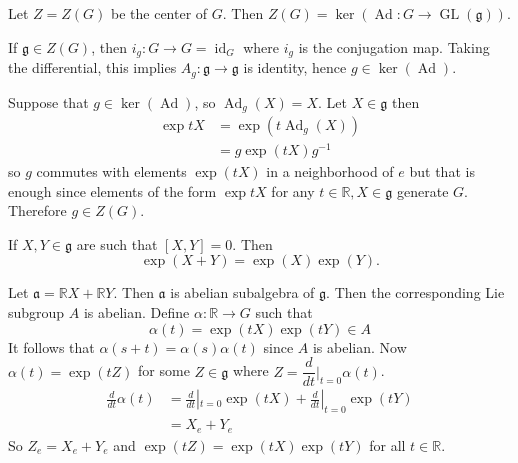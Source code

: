 \documentclass[11pt,a4paper]{scrarticle}
\theoremstyle{definition}
\renewenvironment{proof}[1][\proofname]{\vspace{-15pt}\begin{myproof}}{\end{myproof}}
\theoremstyle{greenbox}
\newcommand{\R}{\mathbb{R}}
\newcommand{\ag}{\mathfrak{a}}
\newcommand{\fg}{\mathfrak{g}}
\begin{document}
\begin{thm}
    Let $ Z = Z(G) $ be the center of $ G $. Then $ Z(G) = \ker ( \operatorname{Ad} : G \to \operatorname{GL}(\fg)) $.
\end{thm}
\begin{proof}
    If $ \fg \in Z(G) $, then $ i_{g}: G \to G = \operatorname{id}_{G} $ where $ i_{g} $ is the conjugation map. Taking the differential, this implies $ A_{g} : \fg  \to \fg$ is identity, hence $ g \in \ker( \operatorname{Ad}) $. 

    Suppose that $ g \in \ker( \operatorname{Ad}) $, %
    so $ \operatorname{Ad}_{g}(X) = X $. Let $ X \in \fg $ then \begin{align*}
        \exp tX & = \exp (t \operatorname{Ad}_{g}(X)) \\
        & = g \exp(tX) g^{-1}
    \end{align*}
    so $ g $ commutes with elements $ \exp(tX) $ in a neighborhood of $ e $ but that is enough since elements of the form $ \exp tX $ for any $ t \in \R, X \in \fg$ generate $ G $. Therefore $ g \in Z(G) $. 
\end{proof}

\begin{proposition}
    If $ X,Y \in \fg $ are such that $ [X,Y] = 0 $. Then 
    \[ \exp(X+Y) = \exp(X) \exp(Y) .\]
\end{proposition}
\begin{proof}
    Let $ \ag = \R X+ \R Y $. Then $ \ag $ is abelian subalgebra of $ \fg $. Then the corresponding Lie subgroup $ A $ is abelian. Define $ \alpha : \R \to G $ such that 
    \[ \alpha(t) = \exp(tX) \exp(tY) \in A\]
    It follows that $ \alpha(s+t) = \alpha(s) \alpha(t) $ since $ A $ is abelian. Now $ \alpha (t) = \exp(tZ) $ for some $ Z \in \fg $ where $ Z = \dfrac{d}{dt}|_{t=0} \alpha(t)$. \begin{align*}
        \frac{d}{dt} \alpha(t) & = \frac{d}{dt}|_{t=0} \exp(tX)+ \frac{d}{dt}|_{t=0} \exp(tY) \\
        & = X_{e}+Y_{e} 
    \end{align*}
    So $ Z_{e} = X_{e}+ Y_{e} $ and $ \exp(tZ) = \exp(tX) \exp(tY) $ for all $ t \in \R $.
\end{proof}
\end{document}
